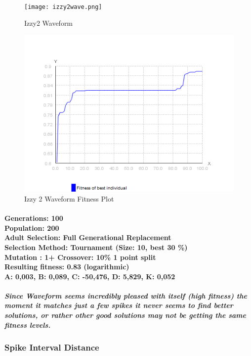 \documentclass[titlepage,norsk]{article}
\begin{document}
\begin{figure}[h!]
\centering
\texttt{[image: izzy2wave.png]}
\caption{Izzy2 Waveform}
\label{fig:awesome_image}
\end{figure}

\begin{figure}[h!]
\centering
\includegraphics[scale=0.75]{izzy1waveFitness.png}
\caption{Izzy 2 Waveform Fitness Plot}
\label{fig:awesome_image}
\end{figure}

\paragraph{
Generations: 100\\
Population: 200\\
Adult Selection: Full Generational Replacement\\
Selection Method: Tournament (Size: 10, best 30 \%) \\
Mutation : 1+%
Crossover: 10\% 1 point split \\
Resulting fitness: 0.83 (logarithmic) \\
 A: 0,003, B: 0,089, C: -50,476, D: 5,829, K: 0,052 \\
}

\subparagraph{Since Waveform seems incredibly pleased with itself (high fitness) the moment it matches just a few spikes it never seems to find better solutions, or rather other good solutions may not be getting the same fitness levels.}

\subsubsection{Spike Interval Distance}
\end{document}
